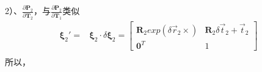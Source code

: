 \documentclass{article}
\begin{document}
2）、$\frac{\partial{\boldsymbol{P}_2}}{\partial{\boldsymbol{T}_2}}$，与$\frac{\partial{\boldsymbol{P}_2}}{\partial{\boldsymbol{T}_1}}$类似
\begin{equation}
	\begin{aligned}
		\boldsymbol{\xi}_2'=                        & \boldsymbol{\xi}_2 \cdot \delta \boldsymbol{\xi}_2 = 
		\left[ 
		\begin{matrix} 
		\boldsymbol{R}_2exp(\delta \vec{r}_2\times) & \boldsymbol{R}_2\delta \vec{t}_2+\vec{t}_2           \\ 
		\boldsymbol{0}^T                            & 1                                                    
		\end{matrix}
		\right] \\
	\end{aligned}
\end{equation}
所以，
\end{document}
